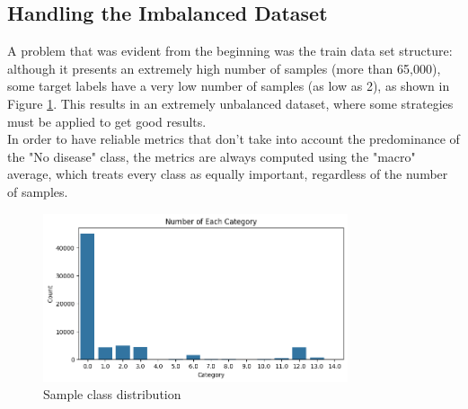\documentclass[a4paper,12pt]{article}
\begin{document}
\subsection*{Handling the Imbalanced Dataset}
A problem that was evident from the beginning was the train data set structure: although it presents an extremely high number of samples (more than 65,000), some target labels have a very low number of samples (as low as 2), as shown in Figure \ref{fig:train-dis}. This results in an extremely unbalanced dataset, where some strategies must be applied to get good results.\\In order to have reliable metrics that don't take into account the predominance of the "No disease" class, the metrics are always computed using the "macro" average, which treats every class as equally important, regardless of the number of samples.

\begin{figure}[h!]
\centering
\includegraphics[width=0.8\textwidth]{Figs/train-set-distribution.png}
\caption{Sample class distribution}
\label{fig:train-dis}
\end{figure}
\end{document}

